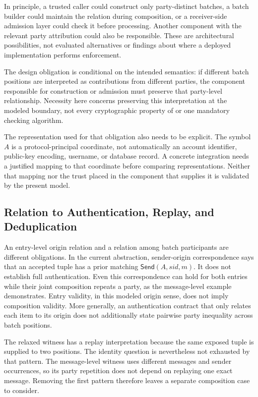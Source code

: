 In principle, a trusted caller could construct only party-distinct batches,
a batch builder could maintain the relation during composition, or a
receiver-side admission layer could check it before processing. Another
component with the relevant party attribution could also be responsible.
These are architectural possibilities, not evaluated alternatives or findings
about where a deployed \kwaay implementation performs enforcement.

The design obligation is conditional on the intended semantics: if different
batch positions are interpreted as contributions from different parties, the
component responsible for construction or admission must preserve that
party-level relationship. Necessity here concerns preserving this
interpretation at the modeled boundary, not every cryptographic property of
\kwaay or one mandatory checking algorithm.

The representation used for that obligation also needs to be explicit. The
symbol \(A\) is a protocol-principal coordinate, not automatically an account
identifier, public-key encoding, username, or database record. A concrete
integration needs a justified mapping to that coordinate before comparing
representations. Neither that mapping nor the trust placed in the component
that supplies it is validated by the present model.

\subsection{Relation to Authentication, Replay, and Deduplication}

An entry-level origin relation and a relation among batch participants are
different obligations. In the current abstraction, sender-origin
correspondence says that an accepted tuple has a prior matching
\(\mathsf{Send}(A,\mathit{sid},m)\). It does not establish full \kwaay
authentication. Even this correspondence can hold for both entries while
their joint composition repeats a party, as the message-level example
demonstrates. Entry validity, in this modeled origin sense, does not imply
composition validity. More generally, an authentication contract that only
relates each item to its origin does not additionally state pairwise party
inequality across batch positions.

The relaxed witness has a replay interpretation because the same exposed
tuple is supplied to two positions. The identity question is nevertheless
not exhausted by that pattern. The message-level witness uses different
messages and sender occurrences, so its party repetition does not depend on
replaying one exact message. Removing the first pattern therefore leaves a
separate composition case to consider.

